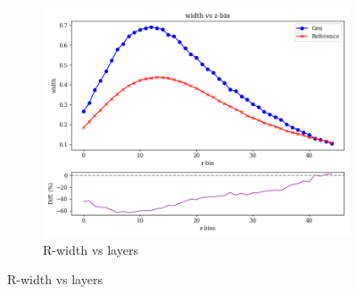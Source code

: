 \begin{figure}
\begin{subfigure}[b]{0.3\textwidth}
        \centering
        \includegraphics[width=\textwidth]{Figures/exponential4.png}
        \caption{R-width vs layers}
        \label{fig:exp4}
    \end{subfigure}
    

    \vspace{0.35cm} %

    

\end{figure}
